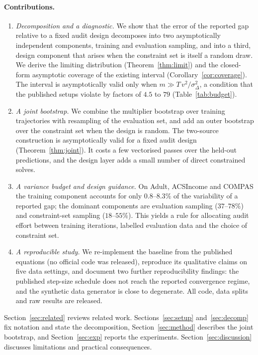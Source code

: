 \documentclass[11pt]{article}
\begin{document}
\paragraph{Contributions.}
\begin{enumerate}
  \item \emph{Decomposition and a diagnostic.}  We show that the error of the reported gap relative to
        a fixed audit design decomposes into two asymptotically independent components, training and
        evaluation sampling, and into a third, design component that arises when the constraint set is
        itself a random draw.  We derive the limiting distribution (Theorem~\ref{thm:limit}) and the
        closed-form asymptotic coverage of the existing interval (Corollary~\ref{cor:coverage}).  The
        interval is asymptotically valid only when $m \gg T\,v^2/\sigma^2_\Delta$, a condition that the published setups violate by factors of $4.5$ to $79$ (Table~\ref{tab:budget}).
  \item \emph{A joint bootstrap.}  We combine the multiplier bootstrap over training trajectories with
        resampling of the evaluation set, and add an outer bootstrap over the constraint set when the
        design is random.  The two-source construction is asymptotically valid for a fixed audit design
        (Theorem~\ref{thm:joint}).  It costs a few vectorised passes over the held-out predictions, and the
        design layer adds a small number of direct constrained solves.
  \item \emph{A variance budget and design guidance.}  On Adult, ACSIncome and COMPAS the training
        component accounts for only $0.8$--$8.3\%$ of the variability of a reported gap; the
        dominant components are evaluation sampling ($37$--$78\%$) and constraint-set sampling
        ($18$--$55\%$).  This yields a rule for allocating audit effort between training
        iterations, labelled evaluation data and the choice of constraint set.
  \item \emph{A reproducible study.}  We re-implement the baseline from the published equations
        (no official code was released), reproduce its qualitative claims on five data settings, and
        document two further reproducibility findings: the published step-size schedule does not reach the reported convergence regime, and the synthetic data generator is close to
        degenerate.  All code, data splits and raw results are released.
\end{enumerate}

Section~\ref{sec:related} reviews related work.  Sections~\ref{sec:setup} and~\ref{sec:decomp} fix notation and state the decomposition, Section~\ref{sec:method} describes the joint bootstrap, and Section~\ref{sec:exp} reports the experiments.  Section~\ref{sec:discussion} discusses limitations and practical consequences.
\end{document}
